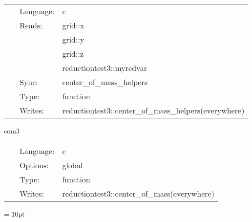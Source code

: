  \begin{tabular*}{160mm}{cll} 
~ & Language:  & c \\ 
~ & Reads:  & grid::x \\ 
~& ~ &grid::y\\ 
~& ~ &grid::z\\ 
~& ~ &reductiontest3::myredvar\\ 
~ & Sync:  & center\_of\_mass\_helpers \\ 
~ & Type:  & function \\ 
~ & Writes:  & reductiontest3::center\_of\_mass\_helpers(everywhere) \\ 
\end{tabular*} 


\vspace{5mm}


\hspace{5mm} com3 

\hspace{5mm}{\it com reductions } 


\hspace{5mm}

 \begin{tabular*}{160mm}{cll} 
~ & Language:  & c \\ 
~ & Options:  & global \\ 
~ & Type:  & function \\ 
~ & Writes:  & reductiontest3::center\_of\_mass(everywhere) \\ 
\end{tabular*} 



\vspace{5mm}\parskip = 10pt 

